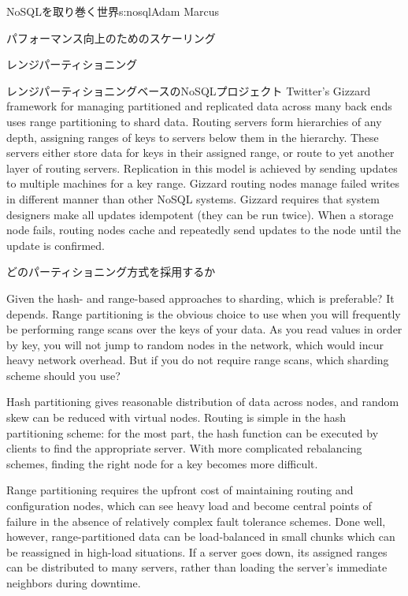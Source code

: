 \begin{aosachapter}{NoSQLを取り巻く世界}{s:nosql}{Adam Marcus}
\begin{aosasect1}{パフォーマンス向上のためのスケーリング}
\begin{aosasect2}{レンジパーティショニング}
\begin{aosasect3}{レンジパーティショニングベースのNoSQLプロジェクト}
Twitter's Gizzard framework for managing partitioned and replicated
data across many back ends uses range partitioning to shard data.
Routing servers form hierarchies of any depth, assigning ranges of
keys to servers below them in the hierarchy.  These servers either
store data for keys in their assigned range, or route to yet another
layer of routing servers.  Replication in this model is achieved by sending
updates to multiple machines for a key range.  Gizzard routing nodes
manage failed writes in different manner than other NoSQL systems.
Gizzard requires that system designers make all updates idempotent
(they can be run twice).  When a storage node fails, routing nodes
cache and repeatedly send updates to the node until the update is
confirmed.

\end{aosasect3}

\end{aosasect2}

\begin{aosasect2}{どのパーティショニング方式を採用するか}

Given the hash- and range-based approaches to sharding, which is
preferable?  It depends.  Range partitioning is the obvious choice to
use when you will frequently be performing range scans over the keys
of your data.  As you read values in order by key, you will not jump
to random nodes in the network, which would incur heavy network
overhead.  But if you do not require range scans, which sharding
scheme should you use?

Hash partitioning gives reasonable distribution of data across nodes,
and random skew can be reduced with virtual nodes.  Routing is simple
in the hash partitioning scheme: for the most part, the hash function
can be executed by clients to find the appropriate server.  With more
complicated rebalancing schemes, finding the right node for a key
becomes more difficult.

Range partitioning requires the upfront cost of maintaining
routing and configuration nodes, which can see heavy load and become
central points of failure in the absence of relatively complex fault
tolerance schemes.  Done well, however, range-partitioned data can be
load-balanced in small chunks which can be reassigned in high-load
situations.  If a server goes down, its assigned ranges can be
distributed to many servers, rather than loading the server's
immediate neighbors during downtime.


\end{aosasect2}
\end{aosasect1}
\end{aosachapter}
